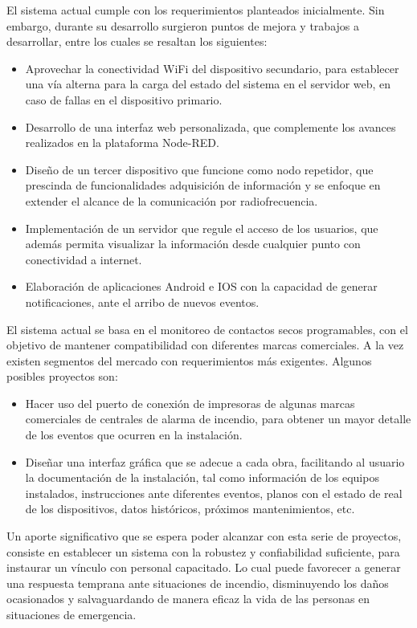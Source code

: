 El sistema actual cumple con los requerimientos planteados inicialmente. Sin embargo, durante su desarrollo surgieron puntos de mejora y trabajos a desarrollar, entre los cuales se resaltan los siguientes:

\begin{itemize}
\item Aprovechar la conectividad WiFi del dispositivo secundario, para establecer una vía alterna para la carga del estado del sistema en el servidor web, en caso de fallas en el dispositivo primario.
\item Desarrollo de una interfaz web personalizada, que complemente los avances realizados en la plataforma Node-RED. 
\item Diseño de un tercer dispositivo que funcione como nodo repetidor, que prescinda de funcionalidades adquisición de información y se enfoque en extender el alcance de la comunicación por radiofrecuencia.    
\item Implementación de un servidor que regule el acceso de los usuarios, que además permita visualizar la información desde cualquier punto con conectividad a internet.
\item Elaboración de aplicaciones Android e IOS con la capacidad de generar notificaciones, ante el arribo de nuevos eventos. 
\end{itemize}

El sistema actual se basa en el monitoreo de contactos secos programables, con el objetivo de mantener compatibilidad con diferentes marcas comerciales. A la vez existen segmentos del mercado con requerimientos más exigentes. Algunos posibles proyectos son:


\begin{itemize}
\item Hacer uso del puerto de conexión de impresoras de algunas marcas comerciales de centrales de alarma de incendio, para obtener un mayor detalle de los eventos que ocurren en la instalación.
\item Diseñar una interfaz gráfica que se adecue a cada obra, facilitando al usuario la documentación de la instalación, tal como información de los equipos instalados, instrucciones ante diferentes eventos, planos con el estado de real de los dispositivos, datos históricos, próximos mantenimientos, etc.
\end{itemize}

Un aporte significativo que se espera poder alcanzar con esta serie de proyectos, consiste en establecer un sistema con la robustez y confiabilidad suficiente, para instaurar un vínculo con personal capacitado. Lo cual puede favorecer a generar una respuesta temprana ante situaciones de incendio, disminuyendo los daños ocasionados y salvaguardando de manera eficaz la vida de las personas en situaciones de emergencia. 
